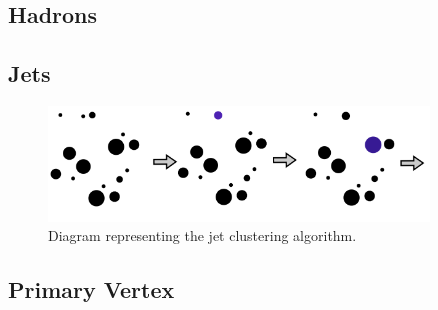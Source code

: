 \subsection{Hadrons}

\subsection{Jets}

\begin{figure}
  \centering
   \includegraphics[width=0.9\textwidth]{fig/experiment/reconstruction/jet_clustering.png}
	\caption{Diagram representing the jet clustering algorithm.}
\end{figure}

\subsection{Primary Vertex}
